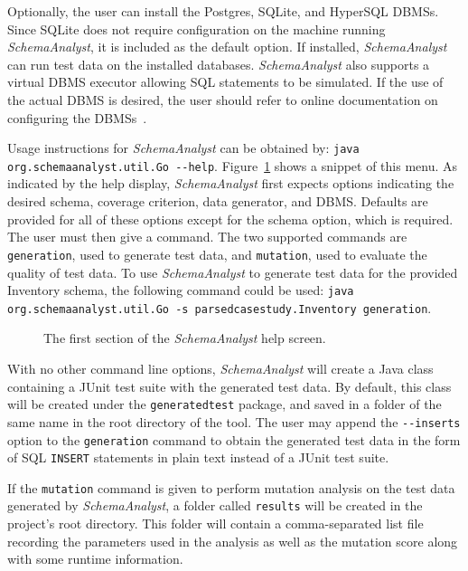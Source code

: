 Optionally, the user can install the Postgres, SQLite, and HyperSQL DBMSs. Since SQLite
does not require configuration on the machine running \textit{SchemaAnalyst}, it is included as the default
option. If installed, \textit{SchemaAnalyst} can run test data on the installed databases. \textit{SchemaAnalyst}
also supports a virtual DBMS executor
allowing SQL statements to be simulated. If the use of the actual DBMS is desired, the user should refer to
online documentation on configuring the DBMSs~\cite{tool}.

Usage instructions for \textit{SchemaAnalyst} can be obtained by: 
\lstinline{java org.schemaanalyst.util.Go --help}. Figure~\ref{fig:usage} shows a snippet of this menu.
As indicated by the help display, \textit{SchemaAnalyst} first expects options indicating the desired
schema, coverage criterion, data generator, and DBMS. Defaults are provided for all of these options
except for the schema option, which is required. The user must then give a command.  The two supported
commands are \lstinline{generation}, used to generate test data, and \lstinline{mutation}, used to
evaluate the quality of test data.
To use \textit{SchemaAnalyst} to generate test data for the provided Inventory schema, the following
command could be used: 
\lstinline{java org.schemaanalyst.util.Go -s parsedcasestudy.Inventory generation}.

\begin{figure}

\caption{\label{fig:usage} The first section of the \textit{SchemaAnalyst} help screen.}
\end{figure}

With no other command line options, \textit{SchemaAnalyst} will create a Java class containing a JUnit test
suite with the generated test data. By default, this class will be created under the \texttt{generatedtest}
package, and saved in a folder of the same name in the root directory of the tool.
The user may append the \lstinline{--inserts} option to the \lstinline{generation} command to obtain the
generated test data in the form of SQL \texttt{INSERT} statements in plain text instead of a JUnit test suite.

If the \lstinline{mutation} command is given to perform mutation analysis on the test data generated by
\textit{SchemaAnalyst}, a folder called \lstinline{results} will be created in the project's root directory.
This folder will contain a comma-separated list file recording the parameters used in the analysis as well
as the mutation score along with some runtime information.

